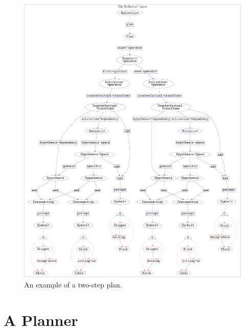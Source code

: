 \begin{figure}
\hspace*{-2cm}\includegraphics[width=18cm]{gfx/example_plan}
\caption[An example of a two-step plan.]{An example of a two-step
  plan.}
\label{figure:example_plan}
\end{figure}

\section{A Planner}

